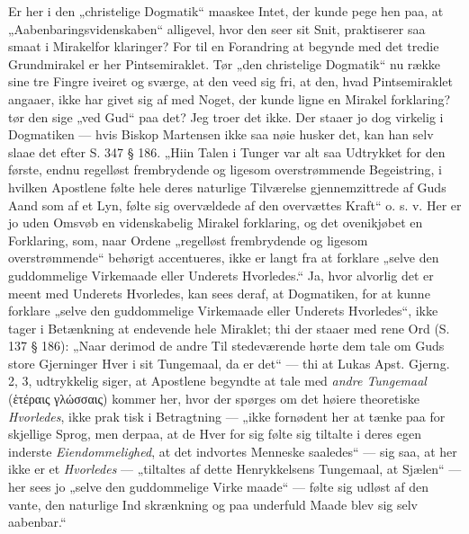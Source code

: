 \documentclass[12pt]{book}
\newcommand{\opage}[1]{\marginnote{\footnotesize\textit{[#1]}}}
\begin{document}
Er her i den „christelige Dogmatik“ maaskee Intet, der
kunde pege hen paa, at „Aabenbaringsvidenskaben“ alligevel,
hvor den seer sit Snit, praktiserer saa smaat i Mirakelfor\-%
klaringer? For til en Forandring at begynde med det tredie
Grundmirakel er her Pintsemiraklet. Tør „den christelige
Dogmatik“ nu række sine tre Fingre iveiret og sværge, at
den veed sig fri, at den, hvad Pintsemiraklet angaaer, ikke
har givet sig af med Noget, der kunde ligne en Mirakel\-%
forklaring? tør den sige „ved Gud“ paa det? Jeg troer
det ikke. Der staaer jo dog virkelig i Dogmatiken --- hvis
Biskop Martensen ikke saa nøie husker det, kan han selv slaae
det efter S. 347 § 186. „Hiin Talen i Tunger var alt\-%
saa Udtrykket for den første, endnu regelløst frembrydende og
ligesom overstrømmende Begeistring, i hvilken Apostlene følte
hele deres naturlige Tilværelse gjennemzittrede af Guds Aand
som af et Lyn, følte sig overvældede af den overvættes Kraft“
o. s. v. Her er jo uden Omsvøb en videnskabelig Mirakel\-%
forklaring, og det ovenikjøbet en Forklaring, som, naar
Ordene „regelløst frembrydende og ligesom overstrømmende“
behørigt accentueres, ikke er langt fra at forklare „selve den
guddommelige Virkemaade eller Underets Hvorledes.“ Ja,
hvor alvorlig det er meent med Underets Hvorledes, kan
sees deraf, at Dogmatiken, for at kunne forklare „selve den
guddommelige Virkemaade eller Underets Hvorledes“, ikke tager
i Betænkning at endevende hele Miraklet; thi der staaer med
rene Ord (S. 137 § 186): „Naar derimod de andre Til\-%
stedeværende hørte dem tale om Guds store Gjerninger Hver
i sit Tungemaal, da er det“ --- thi at Lukas Apst. Gjerng.
2, 3, udtrykkelig siger, at Apostlene begyndte at tale med
\emph{andre Tungemaal} (ἑτέραις γλώσσαις) kommer her, hvor
der spørges om det høiere theoretiske \emph{Hvorledes}, ikke prak\-%
\opage{87}\setcounter{footnote}{0}%
tisk i Betragtning --- „ikke fornødent her at tænke paa for\-%
skjellige Sprog, men derpaa, at de Hver for sig følte sig
tiltalte i deres egen inderste \emph{Eiendommelighed}, at det
indvortes Menneske saaledes“ --- sig saa, at her ikke er et
\emph{Hvorledes} --- „tiltaltes af dette Henrykkelsens Tungemaal,
at Sjælen“ --- her sees jo „selve den guddommelige Virke\-%
maade“ --- følte sig udløst af den vante, den naturlige Ind\-%
skrænkning og paa underfuld Maade blev sig selv aabenbar.“
\end{document}
